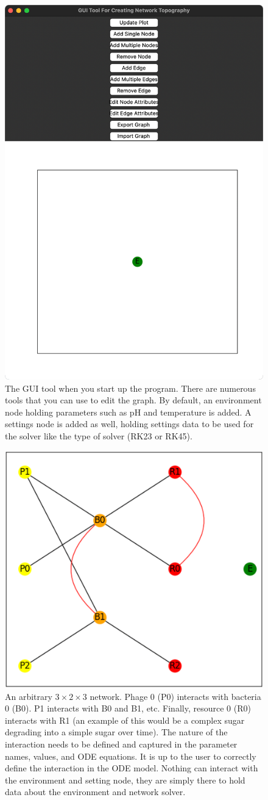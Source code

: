 \begin{figure}
    \centering
    \includegraphics[width=0.5\linewidth]{Screenshots/initial_startup_GUI_tool.png}
    \caption{
        The GUI tool when you start up the program. 
        There are numerous tools that you can use to edit the graph. 
        By default, an environment node holding parameters such as pH and temperature is added. 
        A settings node is added as well, holding settings data to be used for the solver like the type of solver (RK23 or RK45). 
    }
    \label{fig:ss:initial_startup_GUI_tool}
\end{figure}


\begin{figure}
    \centering
    \includegraphics[width=0.5\linewidth]{Screenshots/example_network.png}
    \caption{
        An arbitrary $3\times2\times3$ network. Phage 0 (P0) interacts with bacteria 0 (B0). 
        P1 interacts with B0 and B1, etc. Finally, resource 0 (R0) interacts with R1 (an example of this would be a complex sugar degrading into a simple sugar over time). 
        The nature of the interaction needs to be defined and captured in the parameter names, values, and ODE equations. 
        It is up to the user to correctly define the interaction in the ODE model. 
        Nothing can interact with the environment and setting node, they are simply there to hold data about the environment and network solver.
    }
    \label{fig:ss:example_network}
\end{figure}
 

